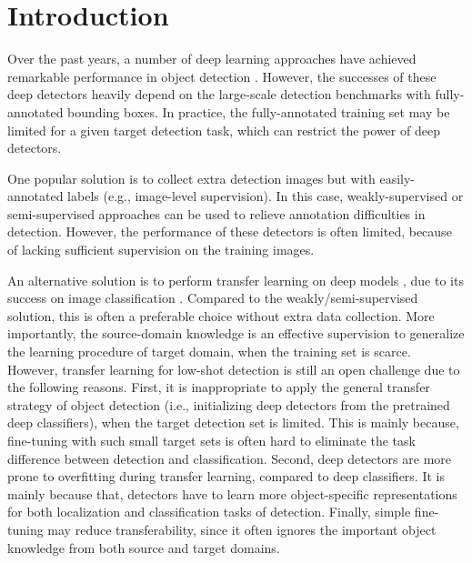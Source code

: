 \documentclass[letterpaper]{article} \usepackage{aaai18}  \usepackage{times}  \usepackage{helvet}  \usepackage{courier}  \usepackage{url}  \usepackage{graphicx}
\begin{document}
\section{Introduction}
Over the past years,
a number of deep learning approaches have achieved remarkable performance in object detection \cite{Girshick2014,Girshick2016Fast,ren2015faster,redmon2016you,Liueccv2016,He2017}.
However,
the successes of these deep detectors heavily depend on the large-scale detection benchmarks with fully-annotated bounding boxes.
In practice,
the fully-annotated training set may be limited for a given target detection task,
which can restrict the power of deep detectors.


One popular solution is to collect extra detection images but with easily-annotated labels (e.g., image-level supervision).
In this case,
weakly-supervised \cite{diba2016weakly,kantorov2016contextlocnet,bilen2016weaklyddn,li2016weakly,cinbis2017,TangCVPR2017}
or
semi-supervised approaches \cite{Tang2016,Singh2016,Liang2016,dong2017few}
can be used to relieve annotation difficulties in detection.
However,
the performance of these detectors is often limited,
because of lacking sufficient supervision on the training images.


An alternative solution is to perform transfer learning on deep models \cite{yosinski2014nips},
due to its success on image classification \cite{Donahue2014,Razavian2014}.
Compared to the weakly/semi-supervised solution,
this is often a preferable choice without extra data collection.
More importantly,
the source-domain knowledge is an effective supervision to generalize the learning procedure of target domain,
when the training set is scarce.
However,
transfer learning for low-shot detection is still an open challenge due to the following reasons.
First,
it is inappropriate to apply the general transfer strategy of object detection (i.e., initializing deep detectors from the pretrained deep classifiers),
when the target detection set is limited.
This is mainly because,
fine-tuning with such small target sets is often hard to eliminate the task difference between detection and classification.
Second,
deep detectors are more prone to overfitting during transfer learning,
compared to deep classifiers.
It is mainly because that,
detectors have to learn more object-specific representations for both localization and classification tasks of detection.
Finally,
simple fine-tuning may reduce transferability,
since it often ignores the important object knowledge from both source and target domains.
\end{document}
